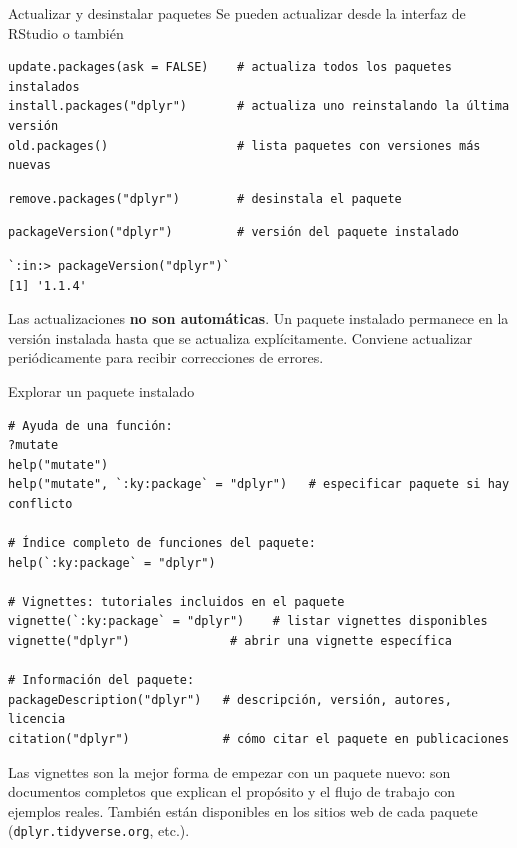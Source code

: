 \documentclass[8pt]{beamer}
\begin{document}
	\begin{frame}[fragile]{Actualizar y desinstalar paquetes}
		Se pueden actualizar desde la interfaz de RStudio o tambi\'en
\begin{lstlisting}[style=RScript]
update.packages(ask = FALSE)    # actualiza todos los paquetes instalados
install.packages("dplyr")       # actualiza uno reinstalando la última versión
old.packages()                  # lista paquetes con versiones más nuevas
\end{lstlisting}

\begin{lstlisting}[style=RScript]
remove.packages("dplyr")        # desinstala el paquete 
\end{lstlisting}

\begin{lstlisting}[style=RScript]
packageVersion("dplyr")         # versión del paquete instalado
\end{lstlisting}
\begin{lstlisting}[style=RConsole]
`:in:> packageVersion("dplyr")`
[1] '1.1.4'
\end{lstlisting}

		\begin{block}{}
			Las actualizaciones \textbf{no son automáticas}. Un paquete instalado permanece en la versión instalada hasta que se actualiza explícitamente. Conviene actualizar periódicamente para recibir correcciones de errores.
		\end{block}
	\end{frame}


	\begin{frame}[fragile]{Explorar un paquete instalado}

\begin{lstlisting}[style=RScript]
# Ayuda de una función:
?mutate
help("mutate")
help("mutate", `:ky:package` = "dplyr")   # especificar paquete si hay conflicto

# Índice completo de funciones del paquete:
help(`:ky:package` = "dplyr")

# Vignettes: tutoriales incluidos en el paquete
vignette(`:ky:package` = "dplyr")    # listar vignettes disponibles
vignette("dplyr")              # abrir una vignette específica

# Información del paquete:
packageDescription("dplyr")   # descripción, versión, autores, licencia
citation("dplyr")             # cómo citar el paquete en publicaciones
\end{lstlisting}

		\begin{exampleblock}{}
			Las vignettes son la mejor forma de empezar con un paquete nuevo: son documentos completos que explican el propósito y el flujo de trabajo con ejemplos reales. También están disponibles en los sitios web de cada paquete (\texttt{dplyr.tidyverse.org}, etc.).
		\end{exampleblock}
	\end{frame}
\end{document}
